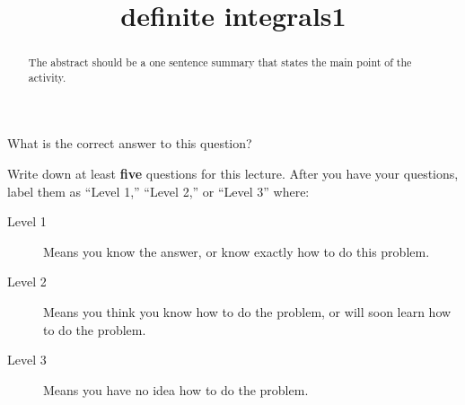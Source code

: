 \documentclass{ximera}
\title{definite integrals1}
\begin{document}
\begin{abstract}
  The abstract should be a one sentence summary that states the main point of the activity.
\end{abstract}

\maketitle

\begin{question}
  What is the correct answer to this question?

  
    \begin{multipleChoice}
    \end{multipleChoice}  
  
\end{question}

Write down at least \textbf{five} questions for this lecture. After
you have your questions, label them as ``Level 1,'' ``Level 2,'' or ``Level 3'' where:
\begin{description}
\item[Level 1] Means you know the answer, or know exactly how to do this problem.
\item[Level 2] Means you think you know how to do the problem, or will soon learn how to do the problem.
\item[Level 3] Means you have no idea how to do the problem. 
\end{description}
\begin{question}
  \begin{freeResponse}
  \end{freeResponse}
\end{question}
\end{document}
